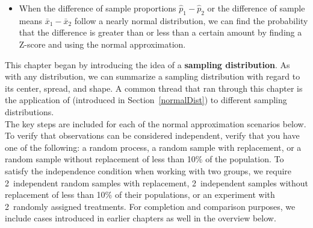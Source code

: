 \begin{itemize}
\item When the difference of sample proportions $\hat{p}_1-\hat{p}_2 $ or the difference of sample means $\bar{x}_1-\bar{x}_2$ follow a nearly normal distribution, we can find the probability that the difference is greater than or less than a certain amount by finding a Z-score and using the normal approximation.  

\end{itemize}

{}

\reviewchapterheader{}
\newcommand{\chdistvertparagraphspace}{3mm}

\noindent This chapter began by introducing the idea of a \textbf{sampling distribution}.  As with any distribution, we can summarize a sampling distribution with regard to its center, spread, and shape.  A common thread that ran through this chapter is the application of  (introduced in Section~\ref{normalDist}) to different sampling distributions.\\[\chdistvertparagraphspace]
The key steps are included for each of the normal approximation scenarios below.  To verify that observations can be considered independent, verify that you have one of the following: a random process, a random sample with replacement, or a random sample without replacement of less than 10\% of the population.
To satisfy the independence condition when working with two groups, we require 2~independent random samples with replacement, 2~independent samples without replacement of less than 10\% of their populations, or an experiment with 2~randomly assigned treatments.
For completion and comparison purposes, we include cases introduced in earlier chapters as well in the overview below.

